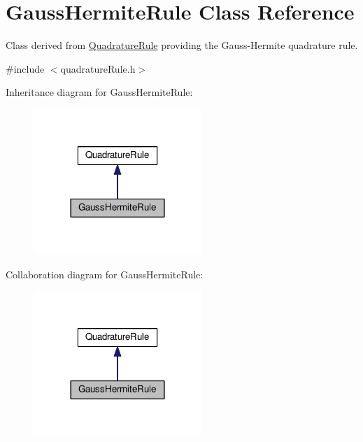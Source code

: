 \hypertarget{classGaussHermiteRule}{\section{Gauss\-Hermite\-Rule Class Reference}
\label{classGaussHermiteRule}
}


Class derived from \hyperlink{classQuadratureRule}{Quadrature\-Rule} providing the Gauss-\/\-Hermite quadrature rule.  




{\ttfamily \#include $<$quadrature\-Rule.\-h$>$}



Inheritance diagram for Gauss\-Hermite\-Rule\-:\nopagebreak
\begin{figure}[H]
\begin{center}
\leavevmode
\includegraphics[width=180pt]{classGaussHermiteRule__inherit__graph}
\end{center}
\end{figure}


Collaboration diagram for Gauss\-Hermite\-Rule\-:\nopagebreak
\begin{figure}[H]
\begin{center}
\leavevmode
\includegraphics[width=180pt]{classGaussHermiteRule__coll__graph}
\end{center}
\end{figure}

